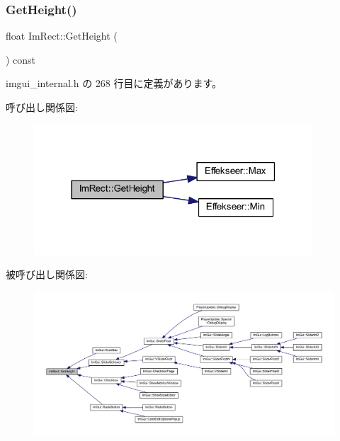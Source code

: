 \subsubsection{\texorpdfstring{Get\+Height()}{GetHeight()}}
{\footnotesize\ttfamily float Im\+Rect\+::\+Get\+Height (\begin{DoxyParamCaption}{ }\end{DoxyParamCaption}) const\hspace{0.3cm}{\ttfamily [inline]}}



 imgui\+\_\+internal.\+h の 268 行目に定義があります。

呼び出し関係図\+:\nopagebreak
\begin{figure}[H]
\begin{center}
\leavevmode
\includegraphics[width=295pt]{struct_im_rect_a748d8ae9cb26508951ec6e2f2df0625b_cgraph}
\end{center}
\end{figure}
被呼び出し関係図\+:\nopagebreak
\begin{figure}[H]
\begin{center}
\leavevmode
\includegraphics[width=350pt]{struct_im_rect_a748d8ae9cb26508951ec6e2f2df0625b_icgraph}
\end{center}
\end{figure}
\mbox{\label{struct_im_rect_ae459d9c50003058cfb34519a571aaf33}} 

